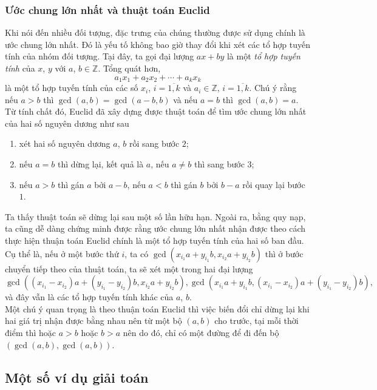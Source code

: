 \subsubsection{Ước chung lớn nhất và thuật toán Euclid}
\noindent Khi nói đến nhiều đối tượng, đặc trưng của chúng thường được sử dụng chính là ước chung lớn nhất. Đó là yếu tố không bao giờ thay đổi khi xét các tổ hợp tuyến tính của nhóm đối tượng. Tại đây, ta gọi đại lượng $ax+by$ là một \textit{tổ hợp tuyến tính} của $x$, $y$ với $a$, $b\in \mathbb{Z}$. Tổng quát hơn, $$a_1x_1+a_2x_2+\cdots+a_kx_k$$ là một tổ hợp tuyến tính của các số $x_i$, $i=\overline{1,k}$ và $a_i\in\mathbb{Z}$, $i=\overline{1,k}$. Chú ý rằng nếu $a>b$ thì $\gcd(a,b)=\gcd(a-b,b)$ và nếu $a=b$ thì $\gcd(a,b)=a$. Từ tính chất đó, Euclid đã xây dựng được thuật toán để tìm ước chung lớn nhất của hai số nguyên dương như sau
\begin{enumerate}
	\item xét hai số nguyên dương $a$, $b$ rồi sang bước $2$;
	\item nếu $a=b$ thì dừng lại, kết quả là $a$, nếu $a\ne b$ thì sang bước $3$;
	\item nếu $a>b$ thì gán $a$ bởi $a-b$, nếu $a<b$ thì gán $b$ bởi $b-a$ rồi quay lại bước $1$.
\end{enumerate}
\noindent Ta thấy thuật toán sẽ dừng lại sau một số lần hữu hạn. Ngoài ra, bằng quy nạp, ta cũng dễ dàng chứng minh được rằng ước chung lớn nhất nhận được theo cách thực hiện thuận toán Euclid chính là một tổ hợp tuyến tính của hai số ban đầu. Cụ thể là, nếu ở một bước thứ $i$, ta có $\gcd(x_{i_1}a+y_{i_1}b,x_{i_2}a+y_{i_2}b)$ thì ở bước chuyển tiếp theo của thuật toán, ta sẽ xét một trong hai đại lượng $$\gcd((x_{i_1}-x_{i_2})a+(y_{i_1}-y_{i_2})b,x_{i_2}a+y_{i_2}b),\gcd(x_{i_1}a+y_{i_1}b,(x_{i_1}-x_{i_2})a+(y_{i_1}-y_{i_2})b),$$
và đây vẫn là các tổ hợp tuyến tính khác của $a$, $b$.\\
Một chú ý quan trọng là theo thuận toán Euclid thì việc biến đổi chỉ dừng lại khi hai giá trị nhận được bằng nhau nên từ một bộ $(a,b)$ cho trước, tại mỗi thời điểm thì hoặc $a>b$ hoặc $b>a$ nên do đó, chỉ có một đường để đi đến bộ $(\gcd(a,b),\gcd(a,b))$.
\subsection{Một số ví dụ giải toán}


